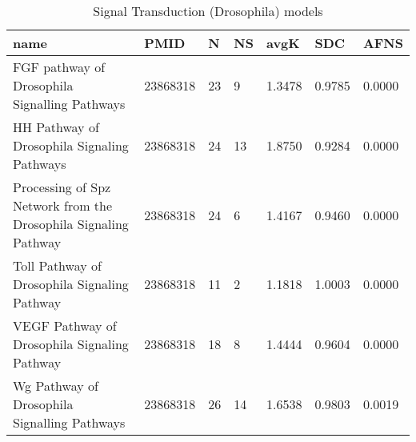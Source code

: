 \begin{table}
\caption{Signal Transduction (Drosophila) models}
\label{tab:Signal_Transduction_(Drosophila)}
\begin{tabular}{|p{180pt}||p{40pt}|p{25pt}|p{25pt}|p{40pt}|p{25pt}|p{25pt}|}
\toprule
name & PMID & N & NS & avgK & SDC & AFNS \\
\midrule
FGF pathway of Drosophila Signalling Pathways & 23868318 & 23 & 9 & 1.3478 & 0.9785 & 0.0000 \\
HH Pathway of Drosophila Signaling Pathways & 23868318 & 24 & 13 & 1.8750 & 0.9284 & 0.0000 \\
Processing of Spz Network from the Drosophila Signaling Pathway & 23868318 & 24 & 6 & 1.4167 & 0.9460 & 0.0000 \\
Toll Pathway of Drosophila Signaling Pathway & 23868318 & 11 & 2 & 1.1818 & 1.0003 & 0.0000 \\
VEGF Pathway of Drosophila Signaling Pathway & 23868318 & 18 & 8 & 1.4444 & 0.9604 & 0.0000 \\
Wg Pathway of Drosophila Signalling Pathways & 23868318 & 26 & 14 & 1.6538 & 0.9803 & 0.0019 \\
\bottomrule
\end{tabular}
\end{table}
